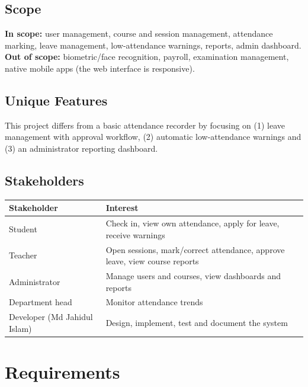 \documentclass[11pt,a4paper]{article}
\begin{document}
\subsection{Scope}
\textbf{In scope:} user management, course and session management, attendance marking,
leave management, low-attendance warnings, reports, admin dashboard.\\
\textbf{Out of scope:} biometric/face recognition, payroll, examination management, native mobile apps
(the web interface is responsive).

\subsection{Unique Features}
This project differs from a basic attendance recorder by focusing on (1) leave management with approval workflow,
(2) automatic low-attendance warnings and (3) an administrator reporting dashboard.

\subsection{Stakeholders}
\begin{tabularx}{\textwidth}{|l|X|}
\hline
\textbf{Stakeholder} & \textbf{Interest}\\
\hline
Student & Check in, view own attendance, apply for leave, receive warnings\\ \hline
Teacher & Open sessions, mark/correct attendance, approve leave, view course reports\\ \hline
Administrator & Manage users and courses, view dashboards and reports\\ \hline
Department head & Monitor attendance trends\\ \hline
Developer (Md Jahidul Islam) & Design, implement, test and document the system\\
\hline
\end{tabularx}

\section{Requirements}
\end{document}
